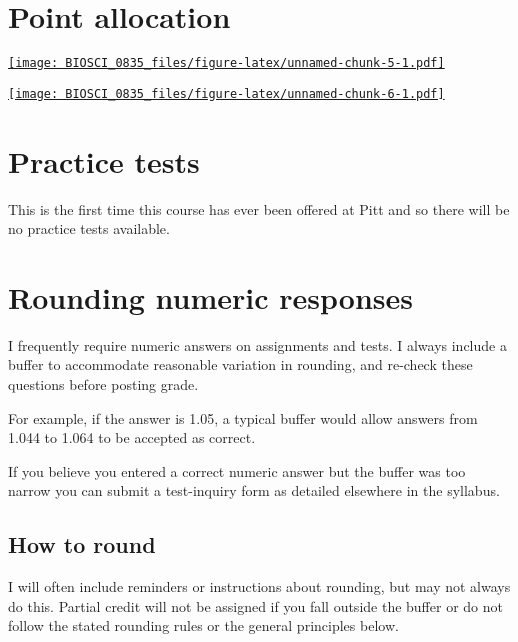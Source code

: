 \documentclass[
]{book}
\begin{document}
\hypertarget{points}{%
\chapter{Point allocation}\label{points}}

\href{https://docs.google.com/spreadsheets/d/13Jb14ZUrnC8IZlBtI5G4ty7c47RdXnNZR-PwpijYGUk/edit?usp=sharing}{\texttt{[image: BIOSCI\_0835\_files/figure-latex/unnamed-chunk-5-1.pdf]}}

\href{https://upload.wikimedia.org/wikipedia/commons/thumb/1/13/Triple_beam_balance3.JPG/240px-Triple_beam_balance3.JPG}{\texttt{[image: BIOSCI\_0835\_files/figure-latex/unnamed-chunk-6-1.pdf]}}

\hypertarget{practice-tests}{%
\chapter{Practice tests}\label{practice-tests}}

This is the first time this course has ever been offered at Pitt and so there will be no practice tests available.

\hypertarget{rounding-numeric-responses}{%
\chapter{Rounding numeric responses}\label{rounding-numeric-responses}}

I frequently require numeric answers on assignments and tests. I always include a buffer to accommodate reasonable variation in rounding, and re-check these questions before posting grade.

For example, if the answer is 1.05, a typical buffer would allow answers from 1.044 to 1.064 to be accepted as correct.

If you believe you entered a correct numeric answer but the buffer was too narrow you can submit a test-inquiry form as detailed elsewhere in the syllabus.

\hypertarget{how-to-round}{%
\section{How to round}\label{how-to-round}}

I will often include reminders or instructions about rounding, but may not always do this. Partial credit will not be assigned if you fall outside the buffer or do not follow the stated rounding rules or the general principles below.
\end{document}
